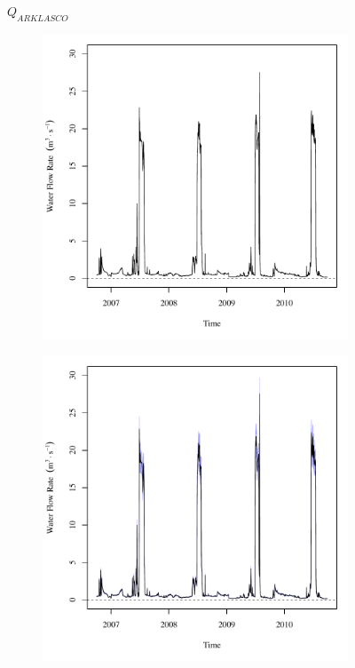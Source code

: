 \begin{linenumbers}
\subfiguretop
\begin{landscape}
	\begin{figure}
		\centering
		$ Q_{ARKLASCO} $
		\begin{subfigure}{0.7\textwidth}
			\centering
			\includegraphics[width=\tableCustomSize]{"Figures/Results_DSR/Deterministic/Q in"}
		\end{subfigure}%
		\begin{subfigure}{0.7\textwidth}
			\centering
			\includegraphics[width=\tableCustomSize]{"Figures/Results_DSR/Stochastic/Q in"}

\end{subfigure}
\end{figure}
\end{landscape}
\end{linenumbers}

